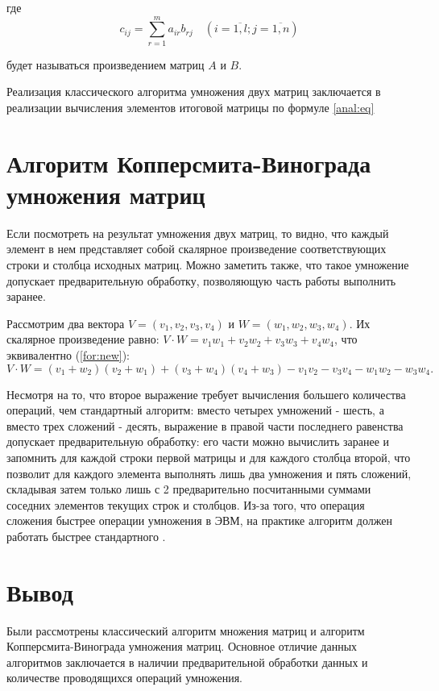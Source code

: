 \documentclass[12pt]{report}
\begin{document}
где
\begin{equation}
	\label{anal:eq}
	c_{ij} =
	\sum_{r=1}^{m} a_{ir}b_{rj} \quad (i=\overline{1,l}; j=\overline{1,n})
\end{equation}

будет называться произведением матриц $A$ и $B$.

Реализация классического алгоритма умножения двух матриц заключается в реализации вычисления элементов итоговой матрицы по формуле \ref{anal:eq}

\section{Алгоритм Копперсмита-Винограда умножения матриц}
Если посмотреть на результат умножения двух матриц, то видно, что каждый элемент в нем представляет собой скалярное произведение соответствующих строки и столбца исходных матриц.
Можно заметить также, что такое умножение допускает предварительную обработку, позволяющую часть работы выполнить заранее.

Рассмотрим два вектора $V = (v_1, v_2, v_3, v_4)$ и $W = (w_1, w_2, w_3, w_4)$.
Их скалярное произведение равно: $V \cdot W = v_1w_1 + v_2w_2 + v_3w_3 + v_4w_4$, что эквивалентно (\ref{for:new}):
\begin{equation}
    \label{for:new}
    V \cdot W = (v_1 + w_2)(v_2 + w_1) + (v_3 + w_4)(v_4 + w_3) - v_1v_2 - v_3v_4 - w_1w_2 - w_3w_4.
\end{equation}

Несмотря на то, что второе выражение требует вычисления большего количества операций, чем стандартный алгоритм: вместо четырех умножений - шесть, а вместо трех сложений - десять, выражение в правой части последнего равенства допускает предварительную обработку: его части можно вычислить заранее и запомнить для каждой строки первой матрицы и для каждого столбца второй, что позволит для каждого элемента выполнять лишь два умножения и пять сложений, складывая затем только лишь с 2 предварительно посчитанными суммами соседних элементов текущих строк и столбцов.
Из-за того, что операция сложения быстрее операции умножения в ЭВМ, на практике алгоритм должен работать быстрее стандартного \cite{PogorelovVolkova}.

\section*{Вывод}
Были рассмотрены классический алгоритм множения матриц и алгоритм Копперсмита-Винограда умножения матриц. Основное отличие данных алгоритмов заключается в наличии предварительной обработки данных и количестве проводящихся операций умножения.
\end{document}

